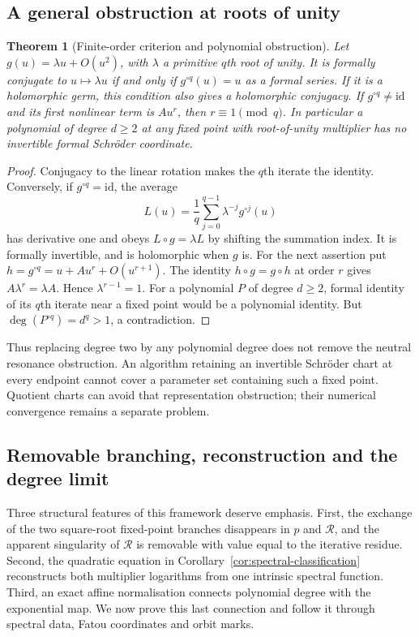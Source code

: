 \documentclass[11pt]{article}
\newtheorem{theorem}{Theorem}
\begin{document}
\subsection{A general obstruction at roots of unity}
\begin{theorem}[Finite-order criterion and polynomial obstruction]
\label{thm:general-resonance}
Let $g(u)=\lambda u+O(u^2)$, with $\lambda$ a primitive $q$th root of
unity. It is formally conjugate to $u\mapsto\lambda u$ if and only if
$g^{\circ q}(u)=u$ as a formal series. If it is a holomorphic germ, this
condition also gives a holomorphic conjugacy. If $g^{\circ q}\ne\mathrm{id}$
and its first nonlinear term is $Au^r$, then $r\equiv1\pmod q$.
In particular a polynomial of degree $d\ge2$ at any fixed point with
root-of-unity multiplier has no invertible formal Schr\"oder coordinate.
\end{theorem}
\begin{proof}
Conjugacy to the linear rotation makes the $q$th iterate the identity.
Conversely, if $g^{\circ q}=\mathrm{id}$, the average
\[
 L(u)=\frac1q\sum_{j=0}^{q-1}\lambda^{-j}g^{\circ j}(u)
\]
has derivative one and obeys $L\circ g=\lambda L$ by shifting the
summation index. It is formally invertible, and is holomorphic when
$g$ is. For the next assertion put $h=g^{\circ q}=u+Au^r+O(u^{r+1})$.
The identity $h\circ g=g\circ h$ at order $r$ gives
$A\lambda^r=\lambda A$. Hence $\lambda^{r-1}=1$.
For a polynomial $P$ of degree $d\ge2$, formal identity of its $q$th
iterate near a fixed point would be a polynomial identity. But
$\deg(P^{\circ q})=d^q>1$, a contradiction.
\end{proof}
Thus replacing degree two by any polynomial degree does not remove
the neutral resonance obstruction. An algorithm retaining an invertible
Schr\"oder chart at every endpoint cannot cover a parameter set containing
such a fixed point. Quotient charts can avoid that representation
obstruction; their numerical convergence remains a separate problem.

\subsection{Removable branching, reconstruction and the degree limit}
\label{sec:degree-exponential}
Three structural features of this framework deserve emphasis. First,
the exchange of the two square-root fixed-point branches disappears
in $p$ and $\mathcal R$, and the apparent singularity of $\mathcal R$
is removable with value equal to the iterative residue. Second, the
quadratic equation in Corollary~\ref{cor:spectral-classification}
reconstructs both multiplier logarithms from one intrinsic spectral
function. Third, an exact affine normalisation connects polynomial
degree with the exponential map. We now prove this last connection
and follow it through spectral data, Fatou coordinates and orbit marks.
\end{document}
